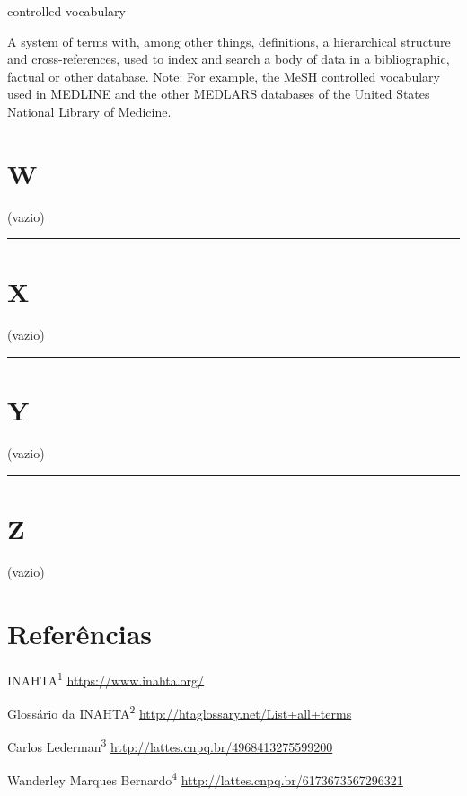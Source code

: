 \documentclass[
]{book}
\begin{document}
controlled vocabulary

A system of terms with, among other things, definitions, a hierarchical structure and cross-references, used to index and search a body of data in a bibliographic, factual or other database. Note: For example, the MeSH controlled vocabulary used in MEDLINE and the other MEDLARS databases of the United States National Library of Medicine.

\hypertarget{w}{%
\chapter*{W}\label{w}}

(vazio)

\begin{center}\rule{0.5\linewidth}{0.5pt}\end{center}

\hypertarget{x}{%
\chapter*{X}\label{x}}

(vazio)

\begin{center}\rule{0.5\linewidth}{0.5pt}\end{center}

\hypertarget{y}{%
\chapter*{Y}\label{y}}

(vazio)

\begin{center}\rule{0.5\linewidth}{0.5pt}\end{center}

\hypertarget{z}{%
\chapter*{Z}\label{z}}

(vazio)

\hypertarget{referuxeancias}{%
\chapter{Referências}\label{referuxeancias}}

INAHTA\textsuperscript{1}
\url{https://www.inahta.org/}

Glossário da INAHTA\textsuperscript{2}
\url{http://htaglossary.net/List+all+terms}

Carlos Lederman\textsuperscript{3}
\url{http://lattes.cnpq.br/4968413275599200}

Wanderley Marques Bernardo\textsuperscript{4}
\url{http://lattes.cnpq.br/6173673567296321}

  
\end{document}
